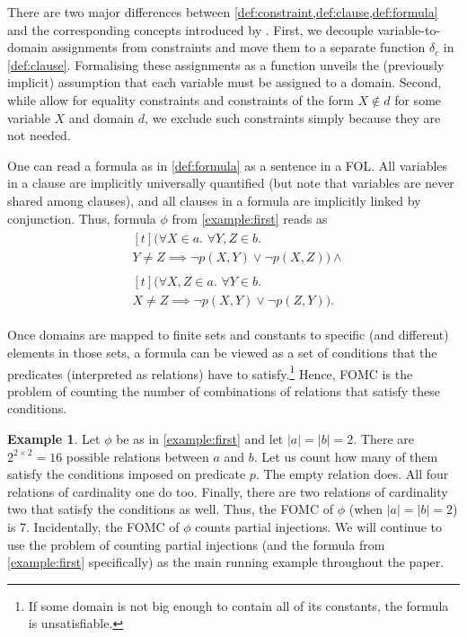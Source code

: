 \documentclass[letterpaper]{article} %
\theoremstyle{definition}
\newtheorem{example}{Example}
\theoremstyle{remark}
\begin{document}
There are two major differences between
\cref{def:constraint,def:clause,def:formula} and the corresponding concepts
introduced by \citet{DBLP:conf/ijcai/BroeckTMDR11}. First, we decouple
variable-to-domain assignments from constraints and move them to a separate
function $\delta_{c}$ in \cref{def:clause}. Formalising these assignments as a
function unveils the (previously implicit) assumption that each variable must be
assigned to a domain. Second, while \citet{DBLP:conf/ijcai/BroeckTMDR11} allow
for equality constraints and constraints of the form $X \not\in d$ for some
variable $X$ and domain $d$, we exclude such constraints simply because they are
not needed.

One can read a formula as in \cref{def:formula} as a sentence in a FOL\@.
All variables in a
clause are implicitly universally quantified (but note that variables are never
shared among clauses), and all clauses in a formula are implicitly linked by
conjunction. Thus, formula $\phi$ from \cref{example:first} reads as
\begin{align*}
  &\begin{multlined}[t]
    (\forall X \in a\text{. }\forall Y, Z \in b\text{. }\\
    Y \ne Z \implies \neg p(X, Y) \lor \neg p(X, Z)) \land
    \end{multlined}\\
  &\begin{multlined}[t]
    (\forall X, Z \in a\text{. }\forall Y \in b\text{. }\\
    X \ne Z \implies \neg p(X, Y) \lor \neg p(Z, Y)).
    \end{multlined}
\end{align*}

Once domains are mapped to finite sets and constants to specific (and different)
elements in those sets, a formula can be viewed as a set of conditions that the
predicates (interpreted as relations) have to satisfy.\footnote{If some domain
  is not big enough to contain all of its constants, the formula is
  unsatisfiable.} Hence, FOMC is the problem of counting the number of
combinations of relations that satisfy these conditions.

\begin{example}
  Let $\phi$ be as in \cref{example:first} and let $|a| = |b| = 2$. There are
  $2^{2 \times 2} = 16$ possible relations between $a$ and $b$. Let us count how
  many of them satisfy the conditions imposed on predicate $p$. The empty
  relation does. All four relations of cardinality one do too. Finally, there
  are two relations of cardinality two that satisfy the conditions as well.
  Thus, the FOMC of $\phi$ (when $|a| = |b| = 2$) is 7. Incidentally, the FOMC
  of $\phi$ counts partial injections. We will continue to use the problem of
  counting partial injections (and the formula from \cref{example:first}
  specifically) as the main running example throughout the paper.
\end{example}
\end{document}

